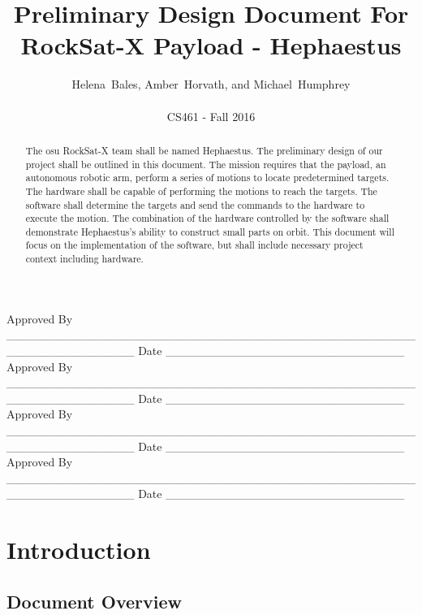 \documentclass[letterpaper,10pt]{article}
\title{Preliminary Design Document For RockSat-X Payload - Hephaestus}
\author{Helena~Bales, Amber~Horvath, and Michael~Humphrey\\ \\ CS461 - Fall 2016}
\newenvironment{bottompar}{\par\vspace*{\fill}}{\clearpage}
\begin{document}
\maketitle

\begin{abstract}
The \gls{osu} RockSat-X team shall be named Hephaestus.
The preliminary design of our project shall be outlined in this document.
The mission requires that the \gls{payload}, an autonomous robotic arm, perform a series of motions to locate predetermined targets.
The hardware shall be capable of performing the motions to reach the targets.
The software shall determine the targets and send the commands to the hardware to execute the motion.
The combination of the hardware controlled by the software shall demonstrate Hephaestus's ability to construct small parts on orbit.
This document will focus on the implementation of the software, but shall include necessary project context including hardware.
\end{abstract}

\begin{bottompar}
Approved By
\_\_\_\_\_\_\_\_\_\_\_\_\_\_\_\_\_\_\_\_\_\_\_\_\_\_\_\_\_\_\_\_\_\_\_\_\_\_\_\_\_\_\_\_\_\_\_\_\_\_\_\_\_\_\_\_\_\_\_\_\_\_\_
Date \_\_\_\_\_\_\_\_\_\_\_\_\_\_\_\_\_\_\_\_\_\_\_\_\_\_\_\_ \\


Approved By
\_\_\_\_\_\_\_\_\_\_\_\_\_\_\_\_\_\_\_\_\_\_\_\_\_\_\_\_\_\_\_\_\_\_\_\_\_\_\_\_\_\_\_\_\_\_\_\_\_\_\_\_\_\_\_\_\_\_\_\_\_\_\_
Date \_\_\_\_\_\_\_\_\_\_\_\_\_\_\_\_\_\_\_\_\_\_\_\_\_\_\_\_ \\


Approved By
\_\_\_\_\_\_\_\_\_\_\_\_\_\_\_\_\_\_\_\_\_\_\_\_\_\_\_\_\_\_\_\_\_\_\_\_\_\_\_\_\_\_\_\_\_\_\_\_\_\_\_\_\_\_\_\_\_\_\_\_\_\_\_
Date \_\_\_\_\_\_\_\_\_\_\_\_\_\_\_\_\_\_\_\_\_\_\_\_\_\_\_\_ \\


Approved By
\_\_\_\_\_\_\_\_\_\_\_\_\_\_\_\_\_\_\_\_\_\_\_\_\_\_\_\_\_\_\_\_\_\_\_\_\_\_\_\_\_\_\_\_\_\_\_\_\_\_\_\_\_\_\_\_\_\_\_\_\_\_\_
Date \_\_\_\_\_\_\_\_\_\_\_\_\_\_\_\_\_\_\_\_\_\_\_\_\_\_\_\_ \\
\end{bottompar}

\clearpage
\tableofcontents
\clearpage

\section{Introduction}
\subsection{Document Overview}
\end{document}
